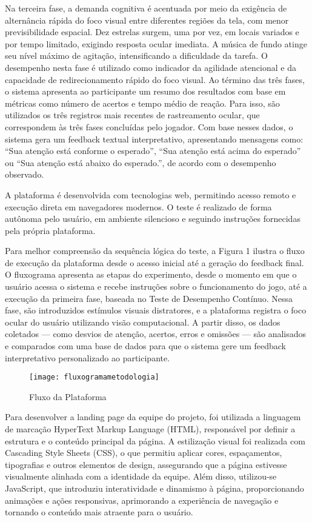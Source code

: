 Na terceira fase, a demanda cognitiva é acentuada por meio da exigência de alternância
rápida do foco visual entre diferentes regiões da tela, com menor previsibilidade espacial.
Dez estrelas surgem, uma por vez, em locais variados e por tempo limitado, exigindo
resposta ocular imediata. A música de fundo atinge seu nível máximo de agitação,
intensificando a dificuldade da tarefa. O desempenho nesta fase é utilizado como indicador
da agilidade atencional e da capacidade de redirecionamento rápido do foco visual.
Ao término das três fases, o sistema apresenta ao participante um resumo dos resultados
com base em métricas como número de acertos e tempo médio de reação. Para isso, são
utilizados os três registros mais recentes de rastreamento ocular, que correspondem às três
fases concluídas pelo jogador. Com base nesses dados, o sistema gera um feedback textual
interpretativo, apresentando mensagens como: “Sua atenção está conforme o esperado”,
“Sua atenção está acima do esperado” ou “Sua atenção está abaixo do esperado.”, de acordo
com o desempenho observado.

A plataforma é desenvolvida com tecnologias web, permitindo acesso remoto e execução
direta em navegadores modernos. O teste é realizado de forma autônoma pelo usuário, em
ambiente silencioso e seguindo instruções fornecidas pela própria plataforma.

Para melhor compreensão da sequência lógica do teste, a Figura 1 ilustra o fluxo de
execução da plataforma desde o acesso inicial até a geração do feedback final. O fluxograma
apresenta as etapas do experimento, desde o momento em que o usuário acessa o sistema e
recebe instruções sobre o funcionamento do jogo, até a execução da primeira fase, baseada
no Teste de Desempenho Contínuo. Nessa fase, são introduzidos estímulos visuais
distratores, e a plataforma registra o foco ocular do usuário utilizando visão computacional. A
partir disso, os dados coletados — como desvios de atenção, acertos, erros e omissões —
são analisados e comparados com uma base de dados para que o sistema gere um feedback
interpretativo personalizado ao participante.

\begin{figure}[H]
    \centering
    \caption{Fluxo da Plataforma}%
    \label{fig:fluxograma-plataforma}
    \texttt{[image: fluxogramametodologia]}
\end{figure}

Para desenvolver a landing page da equipe do projeto, foi utilizada a linguagem de marcação
HyperText Markup Language (HTML), responsável por definir a estrutura e o conteúdo
principal da página. A estilização visual foi realizada com Cascading Style Sheets (CSS), o que
permitiu aplicar cores, espaçamentos, tipografias e outros elementos de design, assegurando
que a página estivesse visualmente alinhada com a identidade da equipe. Além disso,
utilizou-se JavaScript, que introduziu interatividade e dinamismo à página, proporcionando
animações e ações responsivas, aprimorando a experiência de navegação e tornando o
conteúdo mais atraente para o usuário.

